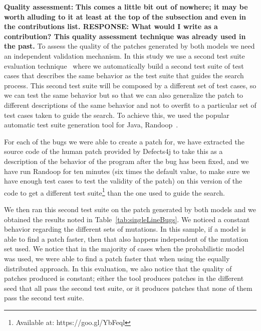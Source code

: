 \documentclass[conference]{IEEEtran}
\newcommand{\todo}[1]
  {{\scriptsize \textbf{\color{red} {#1}}}}
\begin{document}
\textbf{Quality assessment:}\todo{This comes a little bit out of nowhere; it
  may be worth alluding to it at least at the top of the subsection and even in
  the contributions list. RESPONSE: What would I 
  write as a contribution? This quality assessment technique 
  was already used in the past.}
To assess the quality of the patches generated by both models we need an
independent validation mechanism. In this study we use a second test suite 
evaluation technique~\cite{legoues2012,Smith15} where we automatically build a second
test suite of test cases that describes the same behavior as the test suite that
guides the search process. This second test suite will be composed by a
different set of test cases, so we can test the same behavior but so that we can
also generalize the patch to different descriptions of the same behavior and not
to overfit to a particular set of test cases taken to guide the search. To
achieve this, we used the popular automatic test suite generation tool for Java,
Randoop~\cite{pacheco07}. 

For each of the bugs we were able to create a patch for, we have
extracted
the source code of the human patch provided by Defects4j to take this as a
description of the behavior of the program after the bug has been fixed, and we
have run Randoop for ten minutes (six times the default value, to make sure we
have enough test cases to test the validity of the patch) on this version of the
code to get a different test suite\footnote{Available at: https://goo.gl/YbFeql}
than the one used to guide the search.  

We then ran this second test suite on the patch generated by both models and we
obtained the results noted in Table~\ref{tab:singleLineBugs}. We noticed a
constant behavior regarding the different sets of mutations. In this sample, if
a model is able to find a patch faster, then that also happens independent of
the mutation set used. We notice that in the majority of cases when the
probabilistic model was used, we were able to find a patch faster that when
using the equally distributed approach. In this evaluation, we also notice that
the quality of patches produced is constant; either the tool produces patches in
the different seed that all pass the second test suite, or it produces patches
that none of them pass the second test suite.  

\end{document}
